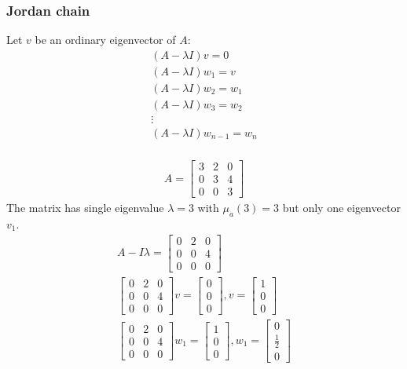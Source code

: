 \subsubsection{Jordan chain}
Let \(v\) be an ordinary eigenvector of \(A\):
\begin{align*}
    (A - \lambda I)v = 0         \\
    (A - \lambda I)w_1 = v       \\
    (A - \lambda I)w_2 = w_1     \\
    (A - \lambda I)w_3 = w_2     \\
    \vdots                       \\
    (A - \lambda I)w_{n-1} = w_n \\
\end{align*}
\begin{example}
    \begin{align*}
        A = \begin{bmatrix}
            3 & 2 & 0 \\ 0 & 3 & 4 \\  0 & 0 & 3
        \end{bmatrix}
    \end{align*}
    The matrix has single eigenvalue \(\lambda = 3\) with \(\mu_a(3) = 3\) but only one eigenvector \(v_1\).
    \begin{align*}
        A - I \lambda = \begin{bmatrix}
            0 & 2 & 0 \\ 0 & 0 & 4 \\  0 & 0 & 0
        \end{bmatrix}                                                   \\
        \begin{bmatrix}
            0 & 2 & 0 \\ 0 & 0 & 4 \\  0 & 0 & 0
        \end{bmatrix} v =  \begin{bmatrix}
            0 \\ 0 \\ 0
        \end{bmatrix}, v = \begin{bmatrix}
            1 \\ 0 \\ 0
        \end{bmatrix} \\
        \begin{bmatrix}
            0 & 2 & 0 \\ 0 & 0 & 4 \\  0 & 0 & 0
        \end{bmatrix} w_1 =  \begin{bmatrix}
            1 \\ 0 \\ 0
        \end{bmatrix}, w_1 = \begin{bmatrix}
            0 \\ \frac{1}{2} \\ 0
        \end{bmatrix}
    \end{align*}
\end{example}
